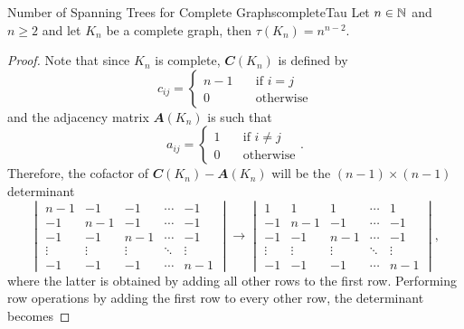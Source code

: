 \documentclass[math]{amznotes}
\theoremstyle{remark}
\newcommand{\0}{\mathbf{0}}
\newcommand{\1}{\mathbf{1}}
\begin{document}
\begin{probox}{Number of Spanning Trees for Complete Graphs}{completeTau}
    Let $n \in \mathbb{N}$ and $n \geq 2$ and let $K_n$ be a complete graph, then $\tau(K_n) = n^{n - 2}$.
    \tcblower
    \begin{proof}
        Note that since $K_n$ is complete, $\mathbfit{C}(K_n)$ is defined by
        \begin{equation*}
            c_{ij} = \begin{cases}
                n - 1 & \quad\textrm{if } i = j \\
                0 & \quad\textrm{otherwise}
            \end{cases}
        \end{equation*}
        and the adjacency matrix $\mathbfit{A}(K_n)$ is such that
        \begin{equation*}
            a_{ij} = \begin{cases}
                1 & \quad\textrm{if } i \neq j \\
                0 & \quad\textrm{otherwise}
            \end{cases}.
        \end{equation*}
        Therefore, the cofactor of $\mathbfit{C}(K_n) - \mathbfit{A}(K_n)$ will be the $(n - 1) \times (n - 1)$ determinant
        \begin{equation*}
            \begin{vmatrix}
                n - 1 & -1 & -1 & \cdots & -1 \\
                -1 & n - 1 & -1 & \cdots & -1 \\
                -1 & -1 & n - 1 & \cdots & -1 \\
                \vdots & \vdots & \vdots & \ddots & \vdots \\
                -1 & -1 & -1 & \cdots & n - 1
            \end{vmatrix} \longrightarrow \begin{vmatrix}
                1 & 1 & 1 & \cdots & 1 \\
                -1 & n - 1 & -1 & \cdots & -1 \\
                -1 & -1 & n - 1 & \cdots & -1 \\
                \vdots & \vdots & \vdots & \ddots & \vdots \\
                -1 & -1 & -1 & \cdots & n - 1
            \end{vmatrix},
        \end{equation*}
        where the latter is obtained by adding all other rows to the first row. Performing row operations by adding the first row to every other row, the determinant becomes

\end{proof}
\end{probox}
\end{document}
